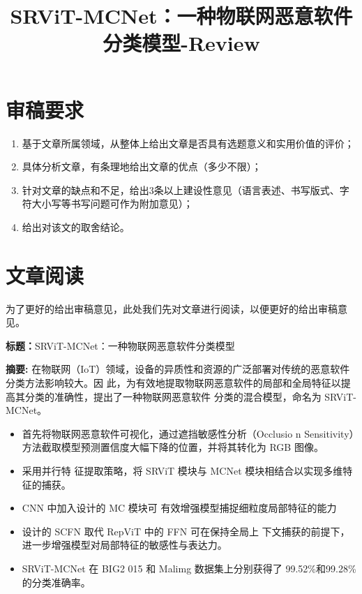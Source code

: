 \documentclass[11pt,a4paper]{article}
\title{SRViT-MCNet：一种物联网恶意软件分类模型-Review}
\renewcommand{\maketitle}{
  \begin{center}
    \LARGE\bfseries\thetitle
  \end{center}
}
\begin{document}
\maketitle

\section{审稿要求}
\begin{enumerate}
  \item 基于文章所属领域，从整体上给出文章是否具有选题意义和实用价值的评价；
  \item 具体分析文章，有条理地给出文章的优点（多少不限）；
  \item 针对文章的缺点和不足，给出3条以上建设性意见（语言表述、书写版式、字符大小写等书写问题可作为附加意见）；
  \item 给出对该文的取舍结论。
\end{enumerate}

\section{文章阅读}

为了更好的给出审稿意见，此处我们先对文章进行阅读，以便更好的给出审稿意见。

\noindent\textbf{标题：}SRViT-MCNet：一种物联网恶意软件分类模型

\noindent\textbf{摘要:} 在物联网（IoT）领域，设备的异质性和资源的广泛部署对传统的恶意软件分类方法影响较大。因
此，为有效地提取物联网恶意软件的局部和全局特征以提高其分类的准确性，提出了一种物联网恶意软件
分类的混合模型，命名为 SRViT-MCNet。
\begin{itemize}
  \item 首先将物联网恶意软件可视化，通过遮挡敏感性分析（Occlusio
  n Sensitivity）方法截取模型预测置信度大幅下降的位置，并将其转化为 RGB 图像。
  \item 采用并行特
  征提取策略，将 SRViT 模块与 MCNet 模块相结合以实现多维特征的捕获。
  \item  CNN 中加入设计的 MC 模块可
  有效增强模型捕捉细粒度局部特征的能力
  \item 设计的 SCFN 取代 RepViT 中的 FFN 可在保持全局上
  下文捕获的前提下，进一步增强模型对局部特征的敏感性与表达力。
  \item SRViT-MCNet 在 BIG2
  015 和 Malimg 数据集上分别获得了 99.52\%和99.28\%的分类准确率。
\end{itemize}
\end{document}
